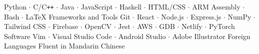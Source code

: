 

\begin{cvskills}
	{Python $\cdot$ C/C\texttt{++} $\cdot$ Java $\cdot$ JavaScript $\cdot$ Haskell $\cdot$ HTML/CSS $\cdot$ ARM Assembly $\cdot$ Bash $\cdot$ \LaTeX}
	\cvskill
	{Frameworks and Tools}
	{Git $\cdot$ React $\cdot$ Node.js $\cdot$ Express.js $\cdot$ NumPy $\cdot$ Tailwind CSS $\cdot$ Firebase $\cdot$ OpenCV $\cdot$ Jest $\cdot$ AWS $\cdot$ GDB $\cdot$ Netlify $\cdot$ PyTorch}
	\cvskill
	{Software}
	{Vim $\cdot$ Visual Studio Code $\cdot$ Android Studio $\cdot$ Adobe Illustrator} 
	\cvskill
	{Foreign Languages}
	{Fluent in Mandarin Chinese}
\end{cvskills}